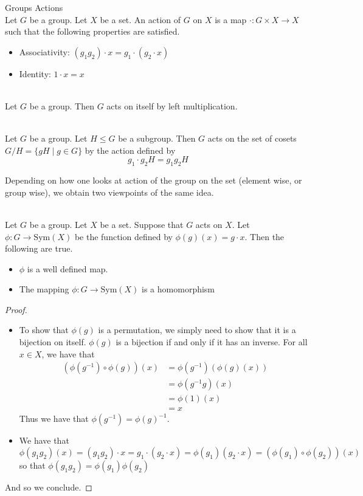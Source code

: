 \documentclass[a4paper]{article}
\begin{document}
\begin{defn}{Groups Actions}{}\\
Let $G$ be a group. Let $X$ be a set. An action of $G$ on $X$ is a map $\cdot:G\times X\to X$ such that the following properties are satisfied. 
\begin{itemize}
\item Associativity: $(g_1g_2)\cdot x=g_1\cdot(g_2\cdot x)$
\item Identity: $1\cdot x=x$
\end{itemize}
\end{defn}

\begin{eg}{}{}\\
Let $G$ be a group. Then $G$ acts on itself by left multiplication. 
\end{eg}

\begin{eg}{}{}\\
Let $G$ be a group. Let $H\leq G$ be a subgroup. Then $G$ acts on the set of cosets $G/H=\{gH\;|\;g\in G\}$ by the action defined by $$g_1\cdot g_2H=g_1g_2H$$
\end{eg}

Depending on how one looks at action of the group on the set (element wise, or group wise), we obtain two viewpoints of the same idea. 

\begin{prp}{}{}\\
Let $G$ be a group. Let $X$ be a set. Suppose that $G$ acts on $X$. Let $\phi:G\to\text{Sym}(X)$ be the function defined by $\phi(g)(x)=g\cdot x$. Then the following are true. 
\begin{itemize}
\item $\phi$ is a well defined map. 
\item The mapping $\phi:G\to\text{Sym}(X)$ is a homomorphism
\end{itemize}
\begin{proof}\\
\begin{itemize}
\item To show that $\phi(g)$ is a permutation, we simply need to show that it is a bijection on itself. $\phi(g)$ is a bijection if and only if it has an inverse. For all $x\in X$, we have that 
\begin{align*}
(\phi(g^{-1})\circ\phi(g))(x)&=\phi(g^{-1})(\phi(g)(x))\\
&=\phi(g^{-1}g)(x)\\
&=\phi(1)(x)\\
&=x
\end{align*} Thus we have that $\phi(g^{-1})=\phi(g)^{-1}$. 
\item We have that $$\phi(g_1g_2)(x)=(g_1g_2)\cdot x=g_1\cdot(g_2\cdot x)=\phi(g_1)(g_2\cdot x)=(\phi(g_1)\circ\phi(g_2))(x)$$ so that $\phi(g_1g_2)=\phi(g_1)\phi(g_2)$
\end{itemize}
And so we conclude. 
\end{proof}
\end{prp}
\end{document}
